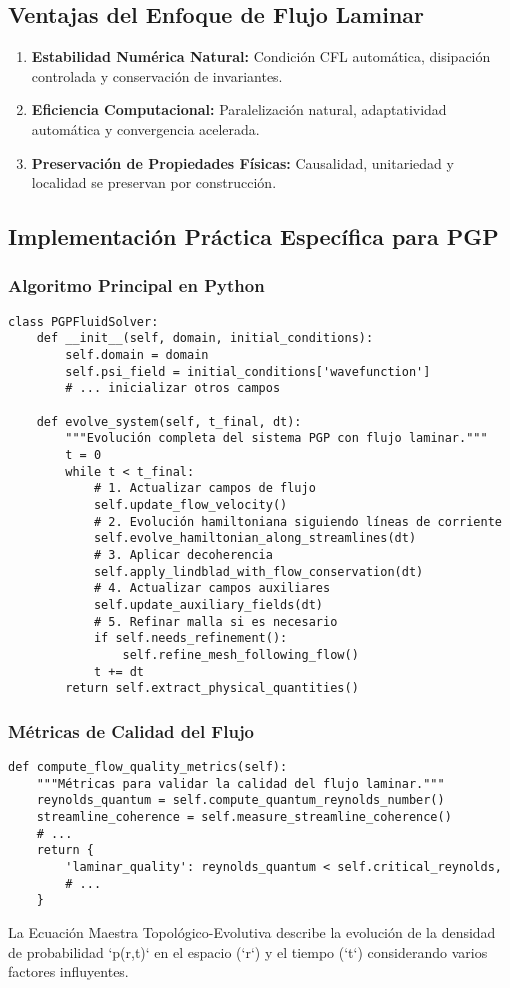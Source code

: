 \documentclass{book}
\begin{document}
\subsection{Ventajas del Enfoque de Flujo Laminar}
\begin{enumerate}
    \item \textbf{Estabilidad Numérica Natural:} Condición CFL automática, disipación controlada y conservación de invariantes.
    \item \textbf{Eficiencia Computacional:} Paralelización natural, adaptatividad automática y convergencia acelerada.
    \item \textbf{Preservación de Propiedades Físicas:} Causalidad, unitariedad y localidad se preservan por construcción.
\end{enumerate}

\subsection{Implementación Práctica Específica para PGP}
\subsubsection{Algoritmo Principal en Python}
\begin{verbatim}
class PGPFluidSolver:
    def __init__(self, domain, initial_conditions):
        self.domain = domain
        self.psi_field = initial_conditions['wavefunction']
        # ... inicializar otros campos

    def evolve_system(self, t_final, dt):
        """Evolución completa del sistema PGP con flujo laminar."""
        t = 0
        while t < t_final:
            # 1. Actualizar campos de flujo
            self.update_flow_velocity()
            # 2. Evolución hamiltoniana siguiendo líneas de corriente
            self.evolve_hamiltonian_along_streamlines(dt)
            # 3. Aplicar decoherencia
            self.apply_lindblad_with_flow_conservation(dt)
            # 4. Actualizar campos auxiliares
            self.update_auxiliary_fields(dt)
            # 5. Refinar malla si es necesario
            if self.needs_refinement():
                self.refine_mesh_following_flow()
            t += dt
        return self.extract_physical_quantities()
\end{verbatim}
\subsubsection*{Métricas de Calidad del Flujo}
\begin{verbatim}
def compute_flow_quality_metrics(self):
    """Métricas para validar la calidad del flujo laminar."""
    reynolds_quantum = self.compute_quantum_reynolds_number()
    streamline_coherence = self.measure_streamline_coherence()
    # ...
    return {
        'laminar_quality': reynolds_quantum < self.critical_reynolds,
        # ...
    }
\end{verbatim}
La Ecuación Maestra Topológico-Evolutiva describe la evolución de la densidad de probabilidad `p(r,t)` en el espacio (`r`) y el tiempo (`t`) considerando varios factores influyentes.
\end{document}
